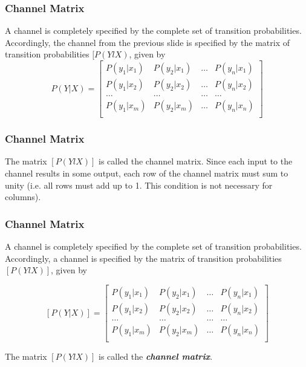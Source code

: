 \documentclass[a4]{beamer}
\begin{document}
%
\begin{frame}
\frametitle{ Channel Matrix}

A channel is completely specified by the complete set of transition probabilities. Accordingly, the
channel from the previous slide is specified by the matrix of transition probabilities $[P(YlX)$, given by
\begin{equation}  P(Y|X)  = \left[ \begin{array}{cccc}
P(y_1|x_1) & P(y_2|x_1) & \ldots & P(y_n|x_1) \\
P(y_1|x_2) & P(y_2|x_2) & \ldots & P(y_n|x_2) \\
\ldots & \ldots & \ldots & \ldots \\
P(y_1|x_m) & P(y_2|x_m) & \ldots & P(y_n|x_n) \\
\end{array} \right] \end{equation}

\end{frame}


\begin{frame}
\frametitle{ Channel Matrix}

The matrix $[P(YlX)]$ is called the channel matrix. Since each input to the channel results in some
output, each row of the channel matrix must sum to unity (i.e. all rows must add up to 1. This condition is not necessary for columns).
\end{frame}

\begin{frame}
\frametitle{Channel Matrix}

A channel is completely specified by the complete set of transition probabilities. Accordingly, a
channel is specified by the matrix of transition probabilities $[P(YlX)]$, given by

\[  [P(Y|X)]  = \left[ \begin{array}{cccc}
P(y_1|x_1) & P(y_2|x_1) & \ldots & P(y_n|x_1) \\
P(y_1|x_2) & P(y_2|x_2) & \ldots & P(y_n|x_2) \\
\ldots & \ldots & \ldots & \ldots \\
P(y_1|x_m) & P(y_2|x_m) & \ldots & P(y_n|x_n) \\
\end{array} \right] \]


The matrix $[P(YlX)]$ is called the \textbf{\emph{channel matrix}}.
\end{frame}
\end{document}
